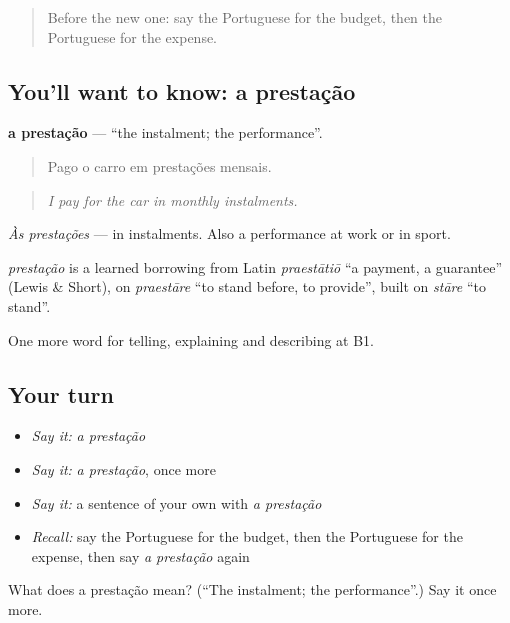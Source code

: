 \begin{quote}
Before the new one: say the Portuguese for the budget, then the Portuguese for the expense.
\end{quote}

\subsection*{You'll want to know: a prestação}
\textbf{a prestação} — \textquotedblleft{}the instalment; the performance\textquotedblright{}.

\begin{quote}
Pago o carro em prestações mensais.
\end{quote}

\begin{quote}
\emph{I pay for the car in monthly instalments.}
\end{quote}

\emph{Às prestações} — in instalments. Also a performance at work or in sport.

\begin{cousinweb}
\emph{prestação} is a learned borrowing from Latin \emph{praestātiō} \textquotedblleft{}a payment, a guarantee\textquotedblright{} (Lewis \& Short), on \emph{praestāre} \textquotedblleft{}to stand before, to provide\textquotedblright{}, built on \emph{stāre} \textquotedblleft{}to stand\textquotedblright{}.
\end{cousinweb}

\begin{grammarlens}[title={What you've built}]
One more word for telling, explaining and describing at B1.
\end{grammarlens}

\subsection*{Your turn}
\begin{itemize}
\raggedright
  \item \emph{Say it:} \emph{a prestação}
  \item \emph{Say it:} \emph{a prestação}, once more
  \item \emph{Say it:} a sentence of your own with \emph{a prestação}
  \item \emph{Recall:} say the Portuguese for the budget, then the Portuguese for the expense, then say \emph{a prestação} again
\end{itemize}

\begin{tcolorbox}[breakable,colback=teal!4,colframe=teal!35!black,title={Before you move on}]
What does a prestação mean? (\textquotedblleft{}The instalment; the performance\textquotedblright{}.) Say it once more.
\end{tcolorbox}
